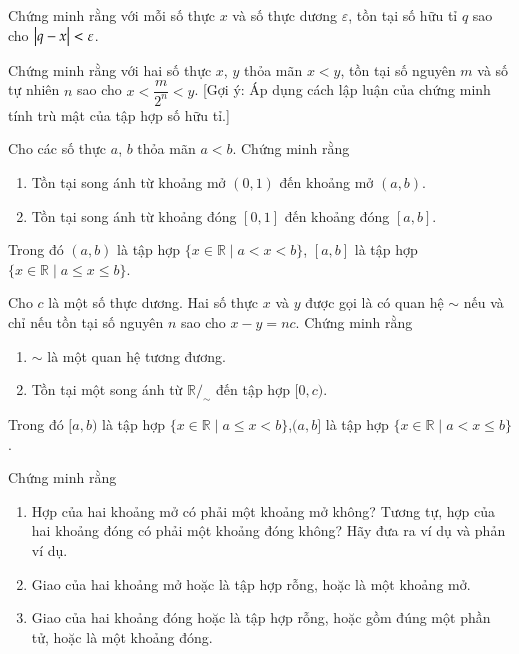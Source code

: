 \begin{exercise}
    Chứng minh rằng với mỗi số thực $x$ và số thực dương $\varepsilon$, tồn tại số hữu tỉ $q$ sao cho $\left\vert{q - x}\right\vert < \varepsilon$.
\end{exercise}

\begin{exercise}
    Chứng minh rằng với hai số thực $x$, $y$ thỏa mãn $x < y$, tồn tại số nguyên $m$ và số tự nhiên $n$ sao cho $x < \dfrac{m}{2^{n}} < y$. [Gợi ý: Áp dụng cách lập luận của chứng minh tính trù mật của tập hợp số hữu tỉ.]
\end{exercise}

\begin{exercise}
    Cho các số thực $a$, $b$ thỏa mãn $a < b$. Chứng minh rằng
    \begin{enumerate}[label={(\roman*)}]
        \item Tồn tại song ánh từ khoảng mở $(0, 1)$ đến khoảng mở $(a, b)$.
        \item Tồn tại song ánh từ khoảng đóng $[0, 1]$ đến khoảng đóng $[a, b]$.
    \end{enumerate}

    Trong đó $(a, b)$ là tập hợp $\{ x\in\mathbb{R} \mid a < x < b \}$, $[a, b]$ là tập hợp $\{ x\in\mathbb{R} \mid a\leq x \leq b \}$.
\end{exercise}

\begin{exercise}
    Cho $c$ là một số thực dương. Hai số thực $x$ và $y$ được gọi là có quan hệ $\sim$ nếu và chỉ nếu tồn tại số nguyên $n$ sao cho $x - y = nc$. Chứng minh rằng
    \begin{enumerate}[label={(\roman*)}]
        \item $\sim$ là một quan hệ tương đương.
        \item Tồn tại một song ánh từ $\mathbb{R}/_{\sim}$ đến tập hợp $[0, c)$.
    \end{enumerate}

    Trong đó $[a, b)$ là tập hợp $\{ x\in\mathbb{R} \mid a\leq x < b \}$,$(a, b]$ là tập hợp $\{ x\in\mathbb{R} \mid a < x \leq b \}$.
\end{exercise}

\begin{exercise}
    Chứng minh rằng
    \begin{enumerate}[label={(\roman*)}]
        \item Hợp của hai khoảng mở có phải một khoảng mở không? Tương tự, hợp của hai khoảng đóng có phải một khoảng đóng không? Hãy đưa ra ví dụ và phản ví dụ.
        \item Giao của hai khoảng mở hoặc là tập hợp rỗng, hoặc là một khoảng mở.
        \item Giao của hai khoảng đóng hoặc là tập hợp rỗng, hoặc gồm đúng một phần tử, hoặc là một khoảng đóng.
    \end{enumerate}
\end{exercise}

